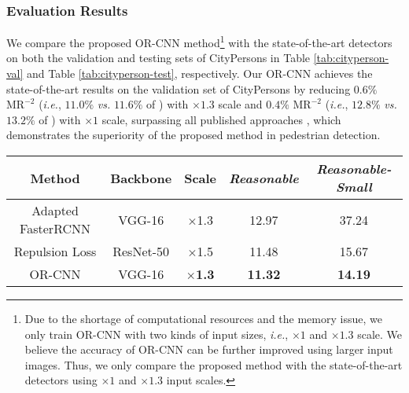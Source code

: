 \documentclass[runningheads]{llncs}
\def\ie{{\em i.e.}}
\begin{document}
\subsubsection{Evaluation Results}
We compare the proposed OR-CNN method\footnote{Due to the shortage of computational resources and the memory issue, we only train OR-CNN with two kinds of input sizes, \ie, $\times1$ and $\times1.3$ scale. We believe the accuracy of OR-CNN can be further improved using larger input images. Thus, we only compare the proposed method with the state-of-the-art detectors using $\times1$ and $\times1.3$ input scales.} with the state-of-the-art detectors \cite{DBLP:journals/corr/abs-1711-07752,DBLP:conf/cvpr/ZhangBS17} on both the validation and testing sets of CityPersons in Table \ref{tab:cityperson-val} and Table \ref{tab:cityperson-test}, respectively. Our OR-CNN achieves the state-of-the-art results on the validation set of CityPersons by reducing $0.6\%$ $\text{MR}^{-2}$ (\ie, $11.0\%$ {\em vs.} $11.6\%$ of \cite{DBLP:journals/corr/abs-1711-07752}) with $\times1.3$ scale and $0.4\%$ $\text{MR}^{-2}$ (\ie, $12.8\%$ {\em vs.} $13.2\%$ of \cite{DBLP:journals/corr/abs-1711-07752}) with $\times1$ scale, surpassing all published approaches \cite{DBLP:journals/corr/abs-1711-07752,DBLP:conf/cvpr/ZhangBS17}, which demonstrates the superiority of the proposed method in pedestrian detection.

\begin{table*}[t]
\centering
\caption{Pedestrian detection results of the proposed OR-CNN method and other state-of-the-art methods on the CityPersons testing set. The scale indicates the enlarge number of original images in training and testing. $\text{MR}^{-2}$ is used to compare of the performance of detectors (lower score indicates better performance).}
\small \setlength{\tabcolsep}{5.5pt}
\begin{tabular}{c|c|c|cc}
\toprule[1.5pt]
Method &Backbone &Scale &{\em Reasonable} &{\em Reasonable-Small} \\\hline
Adapted FasterRCNN \cite{DBLP:conf/cvpr/ZhangBS17} & VGG-16 &$\times$1.3 &12.97 &37.24 \\Repulsion Loss \cite{DBLP:journals/corr/abs-1711-07752} & ResNet-50 &$\times$1.5 &11.48 &15.67 \\\hline
OR-CNN & VGG-16 &\textbf{$\times$1.3} &\textbf{11.32} &\textbf{14.19} \\\bottomrule[1.5pt]
\end{tabular}
\label{tab:cityperson-test}
\end{table*}
\end{document}
